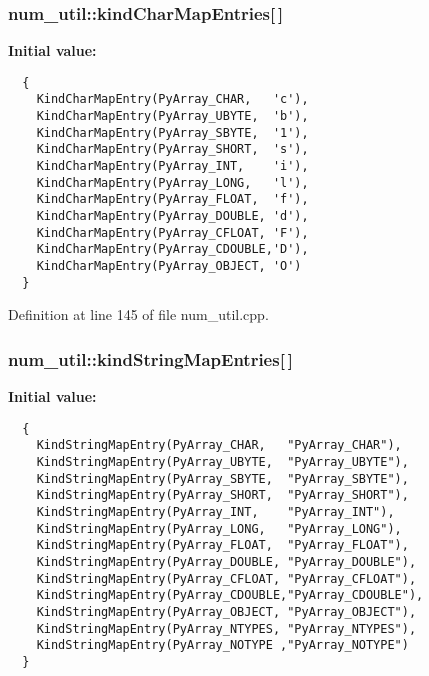 \subsubsection{ {\bf num\_\-util::kind\-Char\-Map\-Entries}[$\,$]}\label{namespacenum__util_a3}


{\bf Initial value:}

\footnotesize\begin{verbatim}
  {
    KindCharMapEntry(PyArray_CHAR,   'c'),
    KindCharMapEntry(PyArray_UBYTE,  'b'),
    KindCharMapEntry(PyArray_SBYTE,  '1'),
    KindCharMapEntry(PyArray_SHORT,  's'),
    KindCharMapEntry(PyArray_INT,    'i'),
    KindCharMapEntry(PyArray_LONG,   'l'),
    KindCharMapEntry(PyArray_FLOAT,  'f'),
    KindCharMapEntry(PyArray_DOUBLE, 'd'),
    KindCharMapEntry(PyArray_CFLOAT, 'F'),
    KindCharMapEntry(PyArray_CDOUBLE,'D'),
    KindCharMapEntry(PyArray_OBJECT, 'O')
  }
\end{verbatim}\normalsize 


Definition at line 145 of file num\_\-util.cpp.
\subsubsection{ {\bf num\_\-util::kind\-String\-Map\-Entries}[$\,$]}\label{namespacenum__util_a1}


{\bf Initial value:}

\footnotesize\begin{verbatim}
  {
    KindStringMapEntry(PyArray_CHAR,   "PyArray_CHAR"),
    KindStringMapEntry(PyArray_UBYTE,  "PyArray_UBYTE"),
    KindStringMapEntry(PyArray_SBYTE,  "PyArray_SBYTE"),
    KindStringMapEntry(PyArray_SHORT,  "PyArray_SHORT"),
    KindStringMapEntry(PyArray_INT,    "PyArray_INT"),
    KindStringMapEntry(PyArray_LONG,   "PyArray_LONG"),
    KindStringMapEntry(PyArray_FLOAT,  "PyArray_FLOAT"),
    KindStringMapEntry(PyArray_DOUBLE, "PyArray_DOUBLE"),
    KindStringMapEntry(PyArray_CFLOAT, "PyArray_CFLOAT"),
    KindStringMapEntry(PyArray_CDOUBLE,"PyArray_CDOUBLE"),
    KindStringMapEntry(PyArray_OBJECT, "PyArray_OBJECT"),
    KindStringMapEntry(PyArray_NTYPES, "PyArray_NTYPES"),
    KindStringMapEntry(PyArray_NOTYPE ,"PyArray_NOTYPE")
  }
\end{verbatim}\normalsize 


